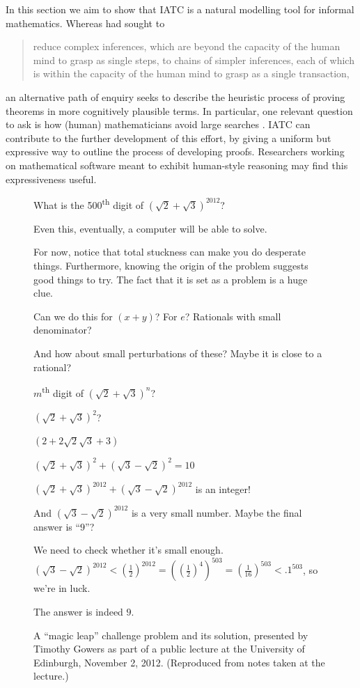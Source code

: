 \documentclass[smallextended,oneside]{svjour3}       %
\let\cite\citep
\begin{document}
In this section we aim to show that IATC is a natural modelling
tool for informal mathematics.
Whereas \citet[p.~23]{robinson1965machine} had sought to
\begin{quote}
reduce complex inferences, which are beyond the capacity of the human
mind to grasp as single steps, to chains of simpler inferences, each
of which is within the capacity of the human mind to grasp as a single
transaction,
\end{quote}
an alternative path of enquiry seeks to describe the heuristic process
of proving theorems in more cognitively plausible terms. 
In particular, one relevant question to ask is
how (human) mathematicians avoid large searches \cite{gowers-talk-ini}.
IATC can contribute to the further development of this effort,
by giving a uniform but expressive way to outline the
process of developing proofs.
Researchers working on mathematical software meant to exhibit
human-style reasoning may find this expressiveness useful.


\begin{figure}
\begin{mdframed}
%
What is the 500\textsuperscript{th} digit of $(\sqrt{2}+\sqrt{3})^{2012}$?

%
Even this, eventually, a computer will be able to solve.

%
For now, notice that total stuckness can make you do desperate things.
Furthermore, knowing the origin of the problem suggests good things to try.
The fact that it is set as a problem is a huge clue.

%
Can we do this for $(x+y)$? For $e$? Rationals with small denominator?

%
And how about small perturbations of these?  Maybe it is close to a rational?

%
$m$\textsuperscript{th} digit of $(\sqrt{2}+\sqrt{3})^n$?

%
$(\sqrt{2}+\sqrt{3})^2$?

%
$(2+2\sqrt{2}\sqrt{3}+3)$

%
$(\sqrt{2}+\sqrt{3})^2+(\sqrt{3}-\sqrt{2})^2=10$

%
$(\sqrt{2}+\sqrt{3})^{2012}+(\sqrt{3}-\sqrt{2})^{2012}$ is an integer!

%
And $(\sqrt{3}-\sqrt{2})^{2012}$ is a very small number.  Maybe the final answer is ``$9$''?

%
We need to check whether it's small enough. $(\sqrt{3}-\sqrt{2})^{2012}<\left(\frac{1}{2}\right)^{2012}=
\left(\left(\frac{1}{2}\right)^{4}\right)^{503}=
\left(\frac{1}{16}\right)^{503}<.1^{503}$, so we're in luck.

%
The answer is indeed $9$.
\end{mdframed}
\caption{A ``magic leap'' challenge problem and its solution, presented by Timothy Gowers as part of a public lecture at the University of Edinburgh, November 2, 2012.  (Reproduced from notes taken at the lecture.)\label{fig:magic-leap}}
\end{figure}
\end{document}
